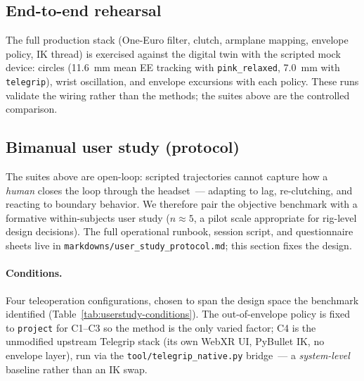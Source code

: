 \begin{table}[h]
  \centering
  \caption{Out-of-envelope suite, \texttt{envelope\_slide} with
  \texttt{pink\_relaxed} (policy comparison; full sweep in
  \texttt{tables/}).}
  \label{tab:envelope}
  \small
  
\end{table}

\subsection{End-to-end rehearsal}

The full production stack (One-Euro filter, clutch, armplane mapping,
envelope policy, IK thread) is exercised against the digital twin with the
scripted mock device: circles (\SI{11.6}{mm} mean EE tracking with
\texttt{pink\_relaxed}, \SI{7.0}{mm} with \texttt{telegrip}), wrist
oscillation, and envelope excursions with each policy. These runs validate
the wiring rather than the methods; the suites above are the controlled
comparison.

\subsection{Bimanual user study (protocol)}
\label{sec:exp-userstudy}

The suites above are open-loop: scripted trajectories cannot capture how a
\emph{human} closes the loop through the headset~--- adapting to lag,
re-clutching, and reacting to boundary behavior. We therefore pair the
objective benchmark with a formative within-subjects user study
(\(n\approx5\), a pilot scale appropriate for rig-level design decisions).
The full operational runbook, session script, and questionnaire sheets live
in \texttt{markdowns/user\_study\_protocol.md}; this section fixes the
design.

\paragraph{Conditions.}
Four teleoperation configurations, chosen to span the design space the
benchmark identified (Table~\ref{tab:userstudy-conditions}). The
out-of-envelope policy is fixed to \texttt{project} for C1--C3 so the
method is the only varied factor; C4 is the unmodified upstream Telegrip
stack (its own WebXR UI, PyBullet IK, no envelope layer), run via the
\texttt{tool/telegrip\_native.py} bridge~--- a \emph{system-level} baseline
rather than an IK swap.

